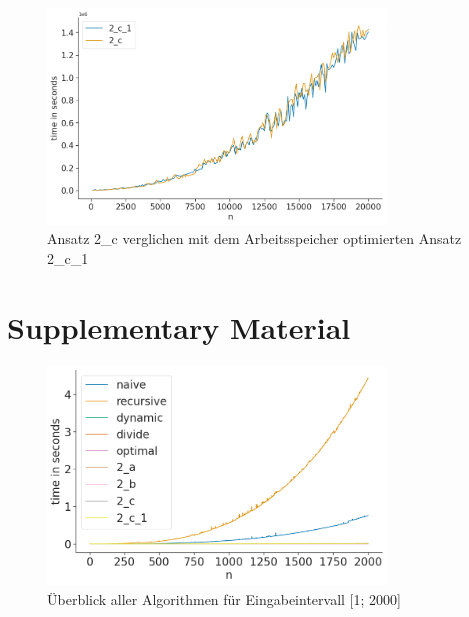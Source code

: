 \documentclass[10pt]{article}
\begin{document}
\begin{figure}[t]
    \centering
    \includegraphics[width=0.8\textwidth]{../times_2c_20000.png}
    \caption{Ansatz 2\_c verglichen mit dem Arbeitsspeicher optimierten Ansatz 2\_c\_1}
    \label{fig:time_comp_2c}
\end{figure}

\section{Supplementary Material}


\begin{figure}[ht]
    \centering
    \includegraphics[width=0.8\textwidth]{../compare_all.png}
    \caption{Überblick aller Algorithmen für Eingabeintervall [1; 2000]}
    \label{fig:overview}
\end{figure}
\end{document}
